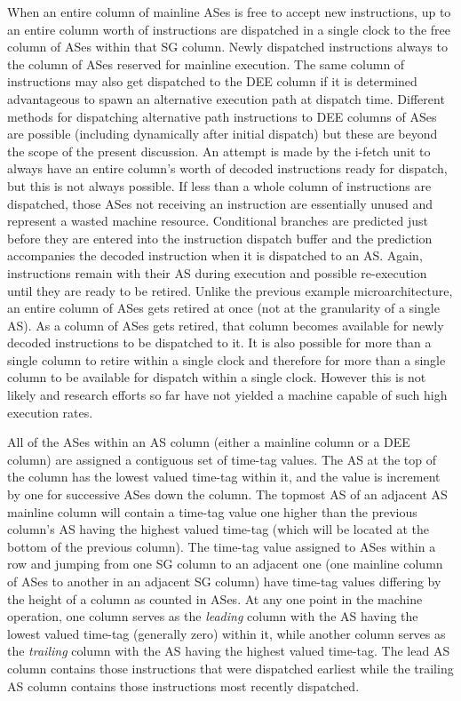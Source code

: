 \documentclass{book}
\begin{document}
When an entire column of mainline ASes
is free to accept new instructions, up
to an entire column worth of instructions are dispatched in a single
clock to the free column of ASes within that SG column.
Newly dispatched instructions always to the column of ASes
reserved for mainline execution.  The same column of instructions
may also get dispatched to the DEE column if it is determined
advantageous to spawn an alternative execution path at dispatch
time.  Different methods for dispatching alternative path
instructions to DEE columns of ASes are possible (including
dynamically after initial dispatch) but these are beyond
the scope of the present discussion.
An attempt is made by the i-fetch unit to always have an entire
column's worth of decoded instructions ready for dispatch,
but this is not always possible.  If less than a whole column
of instructions are dispatched, those ASes not receiving an
instruction are essentially unused and represent a wasted
machine resource.
Conditional branches are
predicted just before they are entered into the instruction
dispatch buffer and the
prediction accompanies the decoded instruction
when it is dispatched to an AS.
Again, instructions remain with their AS during execution and
possible re-execution until they are ready to be retired.
Unlike the previous example microarchitecture, an entire
column of ASes gets retired at once (not at the granularity of
a single AS).
As a column of ASes gets retired, that column becomes available
for newly decoded instructions to be dispatched to it.
It is also possible for more than a single column to retire
within a single clock and therefore for
more than a single column to be available for dispatch within
a single clock.  However this is not likely and research efforts
so far have not yielded a machine capable of such high execution
rates.

All of the ASes within an AS column (either a mainline column or a DEE
column) are assigned a contiguous set of time-tag values.  The AS at the
top of the column has the lowest valued time-tag within it, and the
value is increment by one for successive ASes down the column.
The topmost AS of an adjacent AS mainline column will contain a
time-tag value one higher than the previous column's AS having the
highest valued time-tag (which will be located at the bottom of
the previous column).
The
time-tag value assigned to ASes within a row and jumping from one SG
column to an adjacent one (one mainline column of ASes to another in an
adjacent SG column) have time-tag values differing by the height of a
column as counted in ASes.  
At any one point in the machine operation,
one column serves as the \textit{leading} column with 
the AS having the lowest
valued time-tag (generally zero) within it, 
while another column serves as the \textit{trailing}
column with the AS having the highest valued time-tag.
The lead AS column contains those instructions that were dispatched
earliest while the trailing AS column contains those instructions
most recently dispatched.
\end{document}
